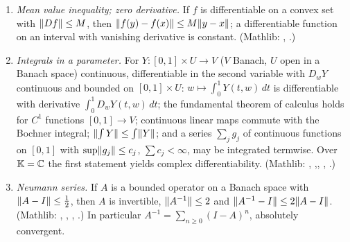 \begin{enumerate}[label=(E\arabic*),leftmargin=*]
  right side absolutely summable (Cauchy products are the case of regrouping by total degree). (Mathlib:
  , , ,
  ,  as the ring
  prototype; the multilinear case follows by continuity of $B$ and iterated regrouping.)
\item\label{bpW:w3:ext-mvt} \emph{Mean value inequality; zero derivative.} If $f$ is differentiable on a convex set
  with $\lVert Df\rVert\le M$, then $\lVert f(y)-f(x)\rVert\le M\lVert y-x\rVert$; a differentiable function on an interval with
  vanishing derivative is constant. (Mathlib: ,
  .)
\item\label{bpW:w3:ext-integral} \emph{Integrals in a parameter.} For $Y:[0,1]\times U\to V$ ($V$ Banach, $U$ open in
  a Banach space) continuous, differentiable in the second variable with $D_wY$ continuous and bounded on
  $[0,1]\times U$: $w\mapsto\int_0^1Y(t,w)\,dt$ is differentiable with derivative $\int_0^1D_wY(t,w)\,dt$; the
  fundamental theorem of calculus holds for $C^1$ functions $[0,1]\to V$; continuous linear maps commute with the
  Bochner integral; $\lVert \int Y\rVert\le\int\lVert Y\rVert$; and a series $\sum_jg_j$ of continuous functions on $[0,1]$
  with $\sup\lVert g_j\rVert\le c_j$, $\sum c_j<\infty$, may be integrated termwise. Over $\mathbb K=\mathbb{C}$ the first
  statement yields complex differentiability. (Mathlib: ,
  ,\linebreak {},\linebreak
  ,\linebreak
  .)
\item\label{bpW:w3:ext-neumann} \emph{Neumann series.} If $A$ is a bounded operator on a Banach space with
  $\lVert A-I\rVert\le\frac12$, then $A$ is invertible, $\lVert A^{-1}\rVert\le2$ and $\lVert A^{-1}-I\rVert\le2\lVert A-I\rVert$. (Mathlib:
  , , ,
  .) In particular $A^{-1}=\sum_{n\ge0}(I-A)^n$, absolutely convergent.
\end{enumerate}

